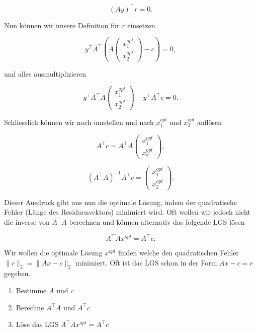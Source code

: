 \begin{equation*}
    (A  y)^\top  r = 0.
\end{equation*}

Nun können wir unsere Definition für \( r \) einsetzen

\begin{equation*}
    y^\top A^\top \left( A \begin{pmatrix}
        x_1^{opt} \\ x_2^{opt}
    \end{pmatrix} -c \right) = 0, 
\end{equation*}

und alles ausmultiplizieren

\begin{equation*}
    y^\top A^\top A \begin{pmatrix}
        x_1^{opt} \\ x_2^{opt}
    \end{pmatrix} - y^\top A^\top c  = 0.
\end{equation*}

Schliesslich können wir noch umstellen und nach \( x_1^{opt} \) und \( x_2^{opt} \) auflösen

\begin{equation*}
    A^\top c = A^\top A \begin{pmatrix}
        x_1^{opt} \\ x_2^{opt} \end{pmatrix},
\end{equation*}

\begin{equation*}
    (A^\top A)^{-1} A^\top c = \begin{pmatrix}
        x_1^{opt} \\ x_2^{opt} \end{pmatrix}.
\end{equation*}

Dieser Ausdruck gibt uns nun die optimale Lösung, indem der quadratische Fehler (Länge des Residuenvektors) minimiert wird. Oft wollen wir jedoch nicht die inverse von \( A^\top A \) berechnen und können alternativ das folgende LGS lösen

\begin{equation*}
    A^\top A x^{opt} = A^\top c.
\end{equation*}

\begin{tcolorbox}[colback=gray!30, colframe=gray!80, title=Kleinste Quadrate]
    Wir wollen die optimale Lösung \( x^{opt} \) finden welche den quadratischen Fehler \( \lVert r \rVert_2 = \lVert A x - c \rVert_2 \) minimiert. Oft ist das LGS schon in der Form \( Ax - c = r \) gegeben. 
    \begin{enumerate}
        \item Bestimme \( A \) und \( c \)
        \item Berechne \( A^\top A \) und \( A^\top c \)
        \item Löse das LGS \( A^\top A x^{opt} = A^\top c \)
    \end{enumerate}
\end{tcolorbox}

